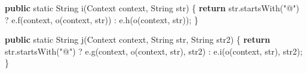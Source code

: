\documentclass[
]{article}
\newenvironment{Shaded}{}{}
\newcommand{\BuiltInTok}[1]{\textcolor[rgb]{0.00,0.50,0.00}{#1}}
\newcommand{\ControlFlowTok}[1]{\textcolor[rgb]{0.00,0.44,0.13}{\textbf{#1}}}
\newcommand{\DataTypeTok}[1]{\textcolor[rgb]{0.56,0.13,0.00}{#1}}
\newcommand{\FunctionTok}[1]{\textcolor[rgb]{0.02,0.16,0.49}{#1}}
\newcommand{\KeywordTok}[1]{\textcolor[rgb]{0.00,0.44,0.13}{\textbf{#1}}}
\newcommand{\NormalTok}[1]{#1}
\newcommand{\OperatorTok}[1]{\textcolor[rgb]{0.40,0.40,0.40}{#1}}
\newcommand{\StringTok}[1]{\textcolor[rgb]{0.25,0.44,0.63}{#1}}
\begin{document}
\begin{Shaded}
\begin{Highlighting}[]
    \KeywordTok{public} \DataTypeTok{static} \BuiltInTok{String} \FunctionTok{i}\OperatorTok{(}\BuiltInTok{Context}\NormalTok{ context}\OperatorTok{,} \BuiltInTok{String}\NormalTok{ str}\OperatorTok{)} \OperatorTok{\{}
        \ControlFlowTok{return}\NormalTok{ str}\OperatorTok{.}\FunctionTok{startsWith}\OperatorTok{(}\StringTok{"@"}\OperatorTok{)} \OperatorTok{?}\NormalTok{ e}\OperatorTok{.}\FunctionTok{f}\OperatorTok{(}\NormalTok{context}\OperatorTok{,} \FunctionTok{o}\OperatorTok{(}\NormalTok{context}\OperatorTok{,}\NormalTok{ str}\OperatorTok{))} \OperatorTok{:}\NormalTok{ e}\OperatorTok{.}\FunctionTok{h}\OperatorTok{(}\FunctionTok{o}\OperatorTok{(}\NormalTok{context}\OperatorTok{,}\NormalTok{ str}\OperatorTok{));}
    \OperatorTok{\}}

    \KeywordTok{public} \DataTypeTok{static} \BuiltInTok{String} \FunctionTok{j}\OperatorTok{(}\BuiltInTok{Context}\NormalTok{ context}\OperatorTok{,} \BuiltInTok{String}\NormalTok{ str}\OperatorTok{,} \BuiltInTok{String}\NormalTok{ str2}\OperatorTok{)} \OperatorTok{\{}
        \ControlFlowTok{return}\NormalTok{ str}\OperatorTok{.}\FunctionTok{startsWith}\OperatorTok{(}\StringTok{"@"}\OperatorTok{)} \OperatorTok{?}\NormalTok{ e}\OperatorTok{.}\FunctionTok{g}\OperatorTok{(}\NormalTok{context}\OperatorTok{,} \FunctionTok{o}\OperatorTok{(}\NormalTok{context}\OperatorTok{,}\NormalTok{ str}\OperatorTok{),}\NormalTok{ str2}\OperatorTok{)} \OperatorTok{:}\NormalTok{ e}\OperatorTok{.}\FunctionTok{i}\OperatorTok{(}\FunctionTok{o}\OperatorTok{(}\NormalTok{context}\OperatorTok{,}\NormalTok{ str}\OperatorTok{),}\NormalTok{ str2}\OperatorTok{);}
    \OperatorTok{\}}


\end{Highlighting}
\end{Shaded}
\end{document}
